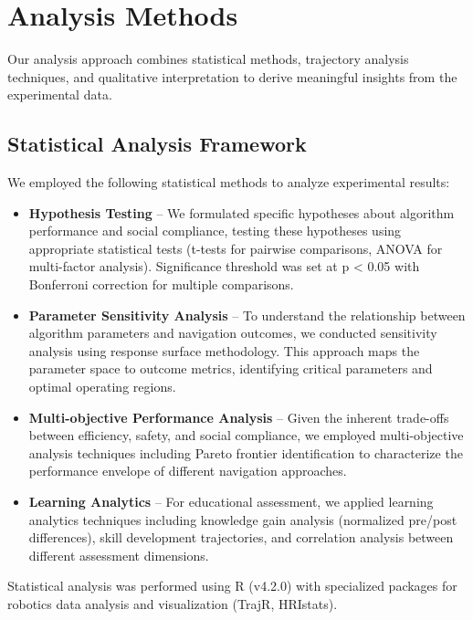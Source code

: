 
\section{Analysis Methods}
\label{sec:analysis_methods}
Our analysis approach combines statistical methods, trajectory analysis techniques, and 
qualitative interpretation to derive meaningful insights from the experimental data.

\subsection{Statistical Analysis Framework}
\label{subsec:statistical_analysis}
We employed the following statistical methods to analyze experimental results:
\begin{itemize}
    \item \textbf{Hypothesis Testing} -- We formulated specific hypotheses about algorithm 
    performance and social compliance, testing these hypotheses using appropriate statistical 
    tests (t-tests for pairwise comparisons, ANOVA for multi-factor analysis). Significance 
    threshold was set at p < 0.05 with Bonferroni correction for multiple comparisons.
    \item \textbf{Parameter Sensitivity Analysis} -- To understand the relationship between 
    algorithm parameters and navigation outcomes, we conducted sensitivity analysis using 
    response surface methodology. This approach maps the parameter space to outcome metrics, 
    identifying critical parameters and optimal operating regions.
    \item \textbf{Multi-objective Performance Analysis} -- Given the inherent trade-offs 
    between efficiency, safety, and social compliance, we employed multi-objective analysis 
    techniques including Pareto frontier identification to characterize the performance 
    envelope of different navigation approaches.
    \item \textbf{Learning Analytics} -- For educational assessment, we applied learning 
    analytics techniques including knowledge gain analysis (normalized pre/post differences), 
    skill development trajectories, and correlation analysis between different assessment 
    dimensions.
\end{itemize}
Statistical analysis was performed using R (v4.2.0) with specialized packages for 
robotics data analysis and visualization (TrajR, HRIstats).

